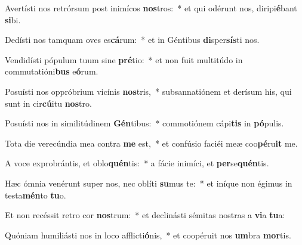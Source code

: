 \item Avertísti nos retrórsum post inimícos \textbf{nos}tros:~* et qui odérunt nos, diripi\textbf{é}bant \textbf{si}bi.
\item Dedísti nos tamquam oves es\textbf{cá}rum:~* et in Géntibus \textbf{di}sper\textbf{sís}ti nos.
\item Vendidísti pópulum tuum sine \textbf{pré}tio:~* et non fuit multitúdo in commutatióni\textbf{bus} e\textbf{ó}rum.
\item Posuísti nos oppróbrium vicínis \textbf{nos}tris,~* subsannatiónem et derísum his, qui sunt in cir\textbf{cú}itu \textbf{nos}tro.
\item Posuísti nos in similitúdinem \textbf{Gén}tibus:~* commotiónem cápi\textbf{tis} in \textbf{pó}pulis.
\item Tota die verecúndia mea contra \textbf{me} est,~* et confúsio faciéi meæ coo\textbf{pé}ru\textbf{it} me.
\item A voce exprobrántis, et oblo\textbf{quén}tis:~* a fácie inimíci, et \textbf{per}se\textbf{quén}tis.
\item Hæc ómnia venérunt super nos, nec oblíti \textbf{su}mus te:~* et iníque non égimus in testa\textbf{mén}to \textbf{tu}o.
\item Et non recéssit retro cor \textbf{nos}trum:~* et declinásti sémitas nostras a \textbf{vi}a \textbf{tu}a:
\item Quóniam humiliásti nos in loco afflicti\textbf{ó}nis,~* et coopéruit nos \textbf{um}bra \textbf{mor}tis.
